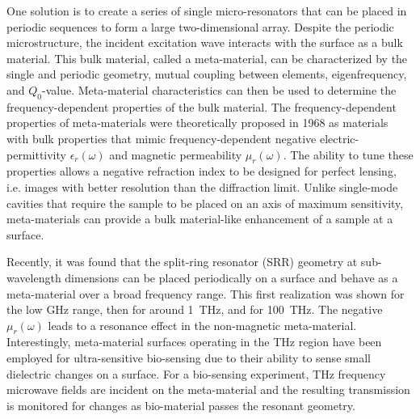 One solution is to create a series of single micro-resonators that can be placed in periodic sequences to form a large two-dimensional array. Despite the periodic microstructure, the incident excitation wave interacts with the surface as a bulk material. \cite{Yen04} This bulk material, called a meta-material, can be characterized by the single and periodic geometry, mutual coupling between elements, eigenfrequency, and $Q_0$-value. Meta-material characteristics can then be used to determine the frequency-dependent properties of the bulk material. The frequency-dependent properties of meta-materials were theoretically proposed in 1968 as materials with bulk properties that mimic frequency-dependent negative electric-permittivity $\epsilon_r(\omega)$ and magnetic permeability $\mu_r(\omega)$. \cite{Veselago68} The ability to tune these properties allows a negative refraction index to be designed for perfect lensing, i.e. images with better resolution than the diffraction limit. \cite{Smith04} Unlike single-mode cavities that require the sample to be placed on an axis of maximum sensitivity, meta-materials can provide a bulk material-like enhancement of a sample at a surface.

Recently, it was found that the split-ring resonator (SRR) geometry at sub-wavelength dimensions can be placed periodically on a surface and behave as a meta-material over a broad frequency range. \cite{Smith00,Yen04,Linden04} This first realization was shown for the low GHz range, \cite{Smith00} then for around 1~THz, \cite{Yen04} and for 100~THz. \cite{Linden04} The negative $\mu_r(\omega)$ leads to a resonance effect in the non-magnetic meta-material. Interestingly, meta-material surfaces operating in the THz region have been employed for ultra-sensitive bio-sensing due to their ability to sense small dielectric changes on a surface. \cite{C7NR03824K} For a bio-sensing experiment, THz frequency microwave fields are incident on the meta-material and the resulting transmission is monitored for changes as bio-material passes the resonant geometry. \cite{Lee2017}

